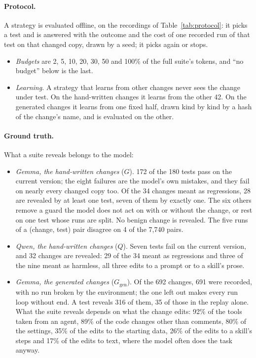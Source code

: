 \documentclass[11pt,a4paper]{article}
\begin{document}
\paragraph{Protocol.} A strategy is evaluated offline, on the recordings of Table~\ref{tab:protocol}: it picks a
test and is answered with the outcome and the cost of one recorded run of that test on that changed copy, drawn by
a seed; it picks again or stops.
\begin{itemize}
  \item \emph{Budgets} are 2, 5, 10, 20, 30, 50 and 100\% of the full suite's tokens, and ``no budget'' below is
        the last.
  \item \emph{Learning.} A strategy that learns from other changes never sees the change under test. On the
        hand-written changes it learns from the other 42. On the generated changes it learns from one fixed half,
        drawn kind by kind by a hash of the change's name, and is evaluated on the other.
\end{itemize}

\paragraph{Ground truth.} What a suite reveals belongs to the model:
\begin{itemize}
  \item \emph{Gemma, the hand-written changes} ($G$). 172 of the 180 tests pass on the current version; the eight
        failures are the model's own mistakes, and they fail on nearly every changed copy too. Of the 34 changes
        meant as regressions, 28 are revealed by at least one test, seven of them by exactly one. The six others
        remove a guard the model does not act on with or without the change, or rest on one test whose runs are
        split. No benign change is revealed. The five runs of a (change, test) pair disagree on 4 of the 7,740
        pairs.
  \item \emph{Qwen, the hand-written changes} ($Q$). Seven tests fail on the current version, and 32 changes are
        revealed: 29 of the 34 meant as regressions and three of the nine meant as harmless, all three edits to a
        prompt or to a skill's prose.
  \item \emph{Gemma, the generated changes} ($G_{\mathrm{gen}}$). Of the 692 changes, 691 were recorded, with no
        run broken by the environment; the one left out makes every run loop without end. A test reveals 316 of
        them, 35 of those in the replay alone. What the suite reveals depends on what the change edits: 92\% of
        the tools taken from an agent, 89\% of the code changes other than comments, 80\% of the settings, 35\% of
        the edits to the starting data, 26\% of the edits to a skill's steps and 17\% of the edits to text, where
        the model often does the task anyway.
\end{itemize}
\end{document}

